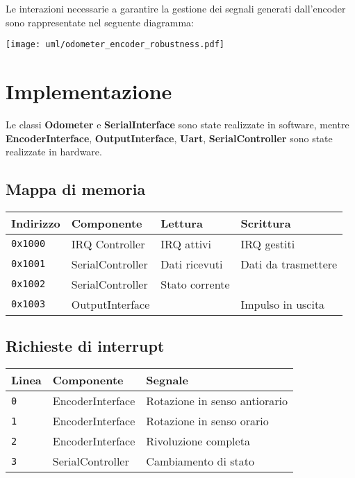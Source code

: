 \documentclass [11pt,a4paper,oneside]{paper}
\newcommand{\component}[1]{\textbf{#1}}
\newcommand{\inputC}[1]{}
\begin{document}
Le interazioni necessarie a garantire la gestione dei segnali
generati dall'encoder sono rappresentate nel seguente diagramma:

\begin{center}
    \texttt{[image: uml/odometer\_encoder\_robustness.pdf]}
    \label{encoder_robustness}
\end{center}


\section{Implementazione}

Le classi \component{Odometer} e \component{SerialInterface} sono state
realizzate in software, mentre \component{EncoderInterface}, 
\component{OutputInterface}, \component{Uart}, \component{SerialController}
sono state realizzate in hardware.

\subsection{Mappa di memoria}
\begin{tabular}{|l|l|l|l|}
\hline
Indirizzo & Componente & Lettura & Scrittura \\
\hline
\texttt{0x1000} & IRQ Controller & IRQ attivi & IRQ gestiti \\
\hline
\texttt{0x1001} & SerialController & Dati ricevuti & Dati da trasmettere \\
\hline
\texttt{0x1002} & SerialController & Stato corrente & \\
\hline
\texttt{0x1003} & OutputInterface & & Impulso in uscita \\
\hline
\end{tabular}

\inputC{software/memory_map.h}

\subsection{Richieste di interrupt}
\begin{tabular}{|l|l|l|}
\hline
Linea & Componente & Segnale \\
\hline
\texttt{0} & EncoderInterface & Rotazione in senso antiorario \\
\hline
\texttt{1} & EncoderInterface & Rotazione in senso orario \\
\hline
\texttt{2} & EncoderInterface & Rivoluzione completa \\
\hline
\texttt{3} & SerialController & Cambiamento di stato \\
\hline
\end{tabular}
\end{document}
